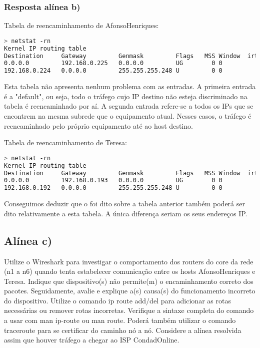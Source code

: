 \documentclass{article}
\begin{document}
\subsubsection{Resposta alínea b)}

Tabela de reencaminhamento de AfonsoHenriques:
\begin{lstlisting}[language=Bash]
> netstat -rn
Kernel IP routing table
Destination     Gateway         Genmask         Flags   MSS Window  irtt Iface
0.0.0.0         192.168.0.225   0.0.0.0         UG        0 0          0 eth0
192.168.0.224   0.0.0.0         255.255.255.248 U         0 0          0 eth0
\end{lstlisting}
Esta tabela não apresenta nenhum problema com as entradas. A primeira entrada é a "default", ou seja, todo o tráfego cujo IP destino não esteja discriminado na tabela é reencaminhado por aí. A segunda entrada refere-se a todos os IPs que se encontrem na mesma subrede que o equipamento atual. Nesses casos, o tráfego é reencaminhado pelo próprio equipamento até ao host destino.
\pagebreak

Tabela de reencaminhamento de Teresa:
\begin{lstlisting}[language=Bash]
> netstat -rn
Kernel IP routing table
Destination     Gateway         Genmask         Flags   MSS Window  irtt Iface
0.0.0.0         192.168.0.193   0.0.0.0         UG        0 0          0 eth0
192.168.0.192   0.0.0.0         255.255.255.248 U         0 0          0 eth0
\end{lstlisting}

Conseguimos deduzir que o foi dito sobre a tabela anterior também poderá ser dito relativamente a esta tabela. A única diferença seriam os seus endereços IP.

\subsection{Alínea c)}
Utilize o Wireshark para investigar o comportamento dos routers do core da rede (n1 a n6) quando tenta
estabelecer comunicação entre os hosts AfonsoHenriques e Teresa. Indique que dispositivo(s) não
permite(m) o encaminhamento correto dos pacotes. Seguidamente, avalie e explique a(s) causa(s) do
funcionamento incorreto do dispositivo.
Utilize o comando ip route add/del para adicionar as rotas necessárias ou remover rotas incorretas. Verifique
a sintaxe completa do comando a usar com man ip-route ou man route. Poderá também utilizar o comando
traceroute para se certificar do caminho nó a nó. Considere a alínea resolvida assim que houver tráfego a
chegar ao ISP CondadOnline.
\end{document}
